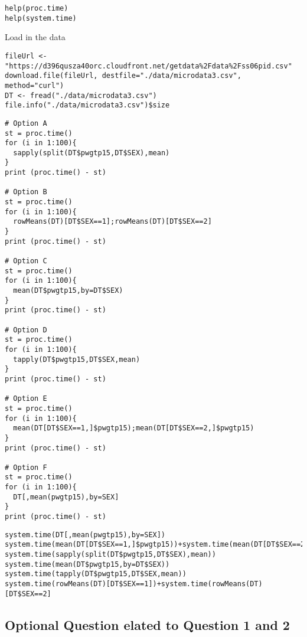 \documentclass[]{article}
\begin{document}
\begin{framed}
\begin{verbatim}
help(proc.time)
help(system.time)
\end{verbatim}
\end{framed}
Load in the data
\begin{framed}
\begin{verbatim}
fileUrl <- "https://d396qusza40orc.cloudfront.net/getdata%2Fdata%2Fss06pid.csv"
download.file(fileUrl, destfile="./data/microdata3.csv", method="curl")
DT <- fread("./data/microdata3.csv")
file.info("./data/microdata3.csv")$size
\end{verbatim}
\end{framed}
\newpage
\begin{framed}
\begin{verbatim}
# Option A
st = proc.time()
for (i in 1:100){
  sapply(split(DT$pwgtp15,DT$SEX),mean)
}
print (proc.time() - st)

# Option B
st = proc.time()
for (i in 1:100){
  rowMeans(DT)[DT$SEX==1];rowMeans(DT)[DT$SEX==2]
}
print (proc.time() - st)

# Option C
st = proc.time()
for (i in 1:100){
  mean(DT$pwgtp15,by=DT$SEX)
}
print (proc.time() - st)

# Option D
st = proc.time()
for (i in 1:100){
  tapply(DT$pwgtp15,DT$SEX,mean)
}
print (proc.time() - st)

# Option E
st = proc.time()
for (i in 1:100){
  mean(DT[DT$SEX==1,]$pwgtp15);mean(DT[DT$SEX==2,]$pwgtp15)
}
print (proc.time() - st)

# Option F
st = proc.time()
for (i in 1:100){
  DT[,mean(pwgtp15),by=SEX]
}
print (proc.time() - st)
\end{verbatim}
\end{framed}

\newpage
\begin{framed}
\begin{verbatim}
system.time(DT[,mean(pwgtp15),by=SEX])
system.time(mean(DT[DT$SEX==1,]$pwgtp15))+system.time(mean(DT[DT$SEX==2,]$pwgtp15))
system.time(sapply(split(DT$pwgtp15,DT$SEX),mean))
system.time(mean(DT$pwgtp15,by=DT$SEX))
system.time(tapply(DT$pwgtp15,DT$SEX,mean))
system.time(rowMeans(DT)[DT$SEX==1])+system.time(rowMeans(DT)[DT$SEX==2]
\end{verbatim}
\end{framed}


\newpage
\subsection*{Optional Question elated to Question 1 and 2}
\end{document}
